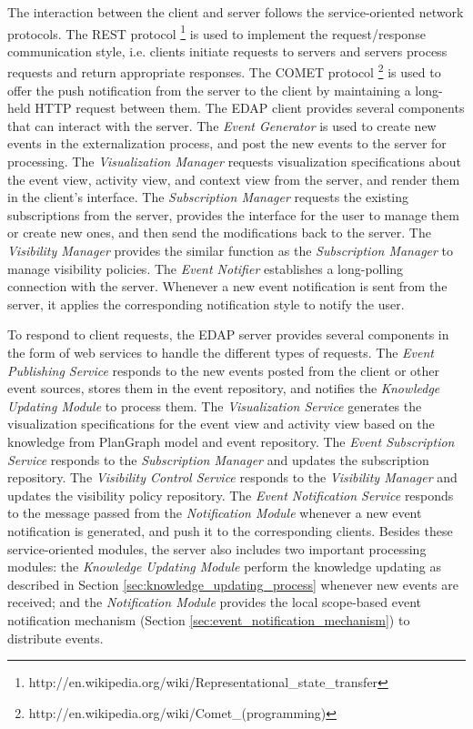 The interaction between the client and server follows the service-oriented network protocols. The REST protocol \footnote{http://en.wikipedia.org/wiki/Representational\_state\_transfer} is used to implement the request/response communication style, i.e. clients initiate requests to servers and servers process requests and return appropriate responses. The COMET protocol \footnote{http://en.wikipedia.org/wiki/Comet\_(programming)} is used to offer the push notification from the server to the client by maintaining a long-held HTTP request between them. 
The EDAP client provides several components that can interact with the server. The \emph{Event Generator} is used to create new events in the externalization process, and post the new events to the server for processing. The \emph{Visualization Manager} requests visualization specifications about the event view, activity view, and context view from the server, and render them in the client's interface. The \emph{Subscription Manager} requests the existing subscriptions from the server, provides the interface for the user to manage them or create new ones, and then send the modifications back to the server. The \emph{Visibility Manager} provides the similar function as the \emph{Subscription Manager} to manage visibility policies. The \emph{Event Notifier} establishes a long-polling connection with the server. Whenever a new event notification is sent from the server, it applies the corresponding notification style to notify the user. 

To respond to client requests, the EDAP server provides several components in the form of web services to handle the different types of requests. The \emph{Event Publishing Service} responds to the new events posted from the client or other event sources, stores them in the event repository, and notifies the \emph{Knowledge Updating Module} to process them. The \emph{Visualization Service} generates the visualization specifications for the event view and activity view based on the knowledge from PlanGraph model and event repository. The \emph{Event Subscription Service} responds to the \emph{Subscription Manager} and updates the subscription repository. The \emph{Visibility Control Service} responds to the \emph{Visibility Manager} and updates the visibility policy repository. The \emph{Event Notification Service} responds to the message passed from the \emph{Notification Module} whenever a new event notification is generated, and push it to the corresponding clients. Besides these service-oriented modules, the server also includes two important processing modules: the \emph{Knowledge Updating Module} perform the knowledge updating as described in Section \ref{sec:knowledge_updating_process} whenever new events are received; and the \emph{Notification Module} provides the local scope-based event notification mechanism (Section \ref{sec:event_notification_mechanism}) to distribute events. 

